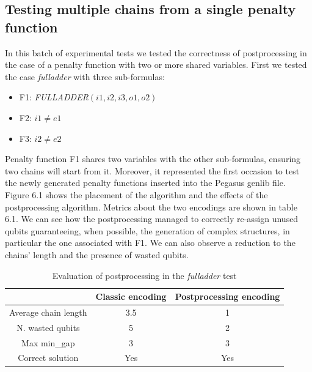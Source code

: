 \subsection{Testing multiple chains from a single penalty function}

In this batch of experimental tests we tested the correctness of postprocessing in the case of a penalty function with two or more shared variables. First we tested the case \textit{fulladder} with three sub-formulas:

\begin{itemize}
    \item F1: \textit{FULLADDER}$(i1,i2,i3,o1,o2)$
    \item F2: $i1 \neq e1$
    \item F3: $i2 \neq e2$
\end{itemize}

Penalty function F1 shares two variables with the other sub-formulas, ensuring two chains will start from it. Moreover, it represented the first occasion to test the newly generated penalty functions inserted into the Pegasus genlib file.
Figure 6.1 shows the placement of the algorithm and the effects of the postprocessing algorithm. Metrics about the two encodings are shown in table 6.1. We can see how the postprocessing managed to correctly re-assign unused qubits guaranteeing, when possible, the generation of complex structures, in particular the one associated with F1. We can also observe a reduction to the chains' length and the presence of wasted qubits. 

\begin{table}[b!]
\centering
\begin{tabular}{|c|c|c|}
\hline
                                             & \cellcolor[HTML]{FFFE65}Classic encoding & \cellcolor[HTML]{FFFE65}Postprocessing encoding \\ \hline
\cellcolor[HTML]{00D2CB}Average chain length & 3.5                                      & 1                                               \\ \hline
\cellcolor[HTML]{00D2CB}N. wasted qubits     & 5                                        & 2                                               \\ \hline
\cellcolor[HTML]{00D2CB}Max min\_gap          & 3                                        & 3                                               \\ \hline
\rowcolor[HTML]{67FD9A} 
\cellcolor[HTML]{00D2CB}Correct solution     & Yes                                      & Yes                                             \\ \hline
\end{tabular}
\caption{Evaluation of postprocessing in the \textit{fulladder} test}
\end{table}

